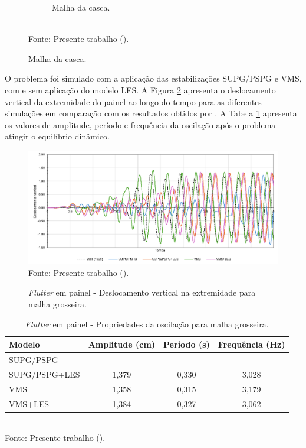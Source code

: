 \begin{figure}[h!]
\begin{subfigure}[b]{0.49\textwidth}
        \caption{Malha da casca.}
    \end{subfigure}
    \\Fonte: Presente trabalho (\the\year).
    \label{fig:meshPanel2}
\end{figure}

O problema foi simulado com a aplicação das estabilizações SUPG/PSPG e VMS, com e sem aplicação do modelo LES. A Figura \ref{fig:prismRes2} apresenta o deslocamento vertical da extremidade do painel ao longo do tempo para as diferentes simulações em comparação com os resultados obtidos por . A Tabela \ref{tab:prismRes2} apresenta os valores de amplitude, período e frequência da oscilação após o problema atingir o equilíbrio dinâmico.

\begin{figure}[h!]
    \centering
    \caption{\textit{Flutter} em painel - Deslocamento vertical na extremidade para malha grosseira.}
    \includegraphics[width=\linewidth]{Figuras/flutter-coarse/disp_y.pdf}
    \\Fonte: Presente trabalho (\the\year).
    \label{fig:prismRes2}
\end{figure}

\begin{table}[h!]
    \centering
    \caption{\textit{Flutter} em painel - Propriedades da oscilação para malha grosseira.}
    \begin{tabular}{lccc}
        \hline
        Modelo        & Amplitude (cm) & Período (s) & Frequência (Hz) \\\hline
        SUPG/PSPG     & -              & -           & -               \\
        SUPG/PSPG+LES & 1,379          & 0,330       & 3,028           \\
        VMS           & 1,358          & 0,315       & 3,179           \\
        VMS+LES       & 1,384          & 0,327       & 3,062           \\\hline
    \end{tabular}
    \\Fonte: Presente trabalho (\the\year).
    \label{tab:prismRes2}
\end{table}

